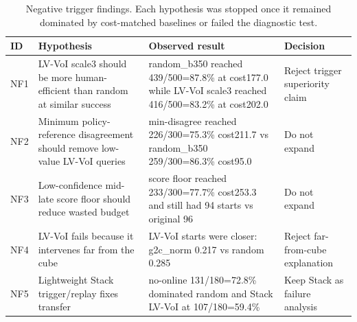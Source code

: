 \begin{table}[t]
\centering
\caption{Negative trigger findings. Each hypothesis was stopped once it remained dominated by cost-matched baselines or failed the diagnostic test.}
\label{tab:negative_findings}
\begin{tabular}{p{}p{}p{}p{}}
\toprule
ID & Hypothesis & Observed result & Decision \\
\midrule
NF1 & LV-VoI scale3 should be more human-efficient than random at similar success & random\_b350 reached 439/500=87.8\% at cost177.0 while LV-VoI scale3 reached 416/500=83.2\% at cost202.0 & Reject trigger superiority claim \\
NF2 & Minimum policy-reference disagreement should remove low-value LV-VoI queries & min-disagree reached 226/300=75.3\% cost211.7 vs random\_b350 259/300=86.3\% cost95.0 & Do not expand \\
NF3 & Low-confidence mid-late score floor should reduce wasted budget & score floor reached 233/300=77.7\% cost253.3 and still had 94 starts vs original 96 & Do not expand \\
NF4 & LV-VoI fails because it intervenes far from the cube & LV-VoI starts were closer: g2c\_norm 0.217 vs random 0.285 & Reject far-from-cube explanation \\
NF5 & Lightweight Stack trigger/replay fixes transfer & no-online 131/180=72.8\% dominated random and Stack LV-VoI at 107/180=59.4\% & Keep Stack as failure analysis \\
\bottomrule
\end{tabular}
\end{table}
